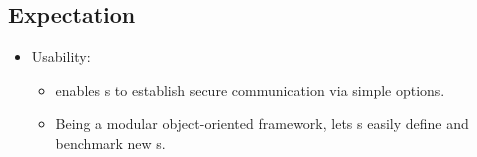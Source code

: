 \documentclass[11pt]{extarticle}
\begin{document}
\begin{flushleft}

\section{Expectation}

\begin{itemize}
\item Usability:
  \begin{itemize}
  \item \cry{} enables \eu s to establish
    secure communication via simple \cl{} options.
  \item Being a modular object-oriented framework,
    \cry{} lets \cg s easily define and benchmark new \cs s.
  \end{itemize}
\end{itemize}


\end{flushleft}
\end{document}

